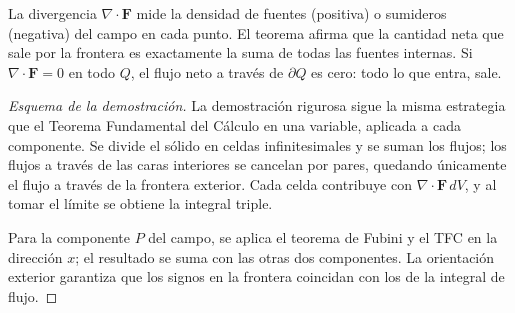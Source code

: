 \begin{rem}
La divergencia $\nabla\cdot\mathbf{F}$ mide la densidad de fuentes (positiva) o sumideros (negativa) del campo en cada punto. El teorema afirma que la cantidad neta que sale por la frontera es exactamente la suma de todas las fuentes internas. Si $\nabla\cdot\mathbf{F}=0$ en todo $Q$, el flujo neto a través de $\partial Q$ es cero: todo lo que entra, sale.
\end{rem}

\begin{proof}[Esquema de la demostración]
La demostración rigurosa sigue la misma estrategia que el Teorema Fundamental del Cálculo en una variable, aplicada a cada componente. Se divide el sólido en celdas infinitesimales y se suman los flujos; los flujos a través de las caras interiores se cancelan por pares, quedando únicamente el flujo a través de la frontera exterior. Cada celda contribuye con $\nabla\cdot\mathbf{F}\,dV$, y al tomar el límite se obtiene la integral triple. 
\par
Para la componente $P$ del campo, se aplica el teorema de Fubini y el TFC en la dirección $x$; el resultado se suma con las otras dos componentes. La orientación exterior garantiza que los signos en la frontera coincidan con los de la integral de flujo.
\end{proof}

